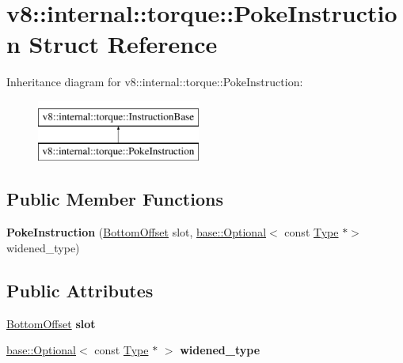 \hypertarget{structv8_1_1internal_1_1torque_1_1PokeInstruction}{}\section{v8\+:\+:internal\+:\+:torque\+:\+:Poke\+Instruction Struct Reference}
\label{structv8_1_1internal_1_1torque_1_1PokeInstruction}
Inheritance diagram for v8\+:\+:internal\+:\+:torque\+:\+:Poke\+Instruction\+:\begin{figure}[H]
\begin{center}
\leavevmode
\includegraphics[height=2.000000cm]{structv8_1_1internal_1_1torque_1_1PokeInstruction}
\end{center}
\end{figure}
\subsection*{Public Member Functions}
\begin{DoxyCompactItemize}
\item 
\mbox{\label{structv8_1_1internal_1_1torque_1_1PokeInstruction_a07a463e794c6716bfea05ec0fee29e9f}} 
{\bfseries Poke\+Instruction} (\mbox{\hyperlink{structv8_1_1internal_1_1torque_1_1BottomOffset}{Bottom\+Offset}} slot, \mbox{\hyperlink{classv8_1_1base_1_1Optional}{base\+::\+Optional}}$<$ const \mbox{\hyperlink{classv8_1_1internal_1_1torque_1_1Type}{Type}} $\ast$$>$ widened\+\_\+type)
\end{DoxyCompactItemize}
\subsection*{Public Attributes}
\begin{DoxyCompactItemize}
\item 
\mbox{\label{structv8_1_1internal_1_1torque_1_1PokeInstruction_a6ea049d9da15d05b06b69e934e3263da}} 
\mbox{\hyperlink{structv8_1_1internal_1_1torque_1_1BottomOffset}{Bottom\+Offset}} {\bfseries slot}
\item 
\mbox{\label{structv8_1_1internal_1_1torque_1_1PokeInstruction_ac2462ddb545decf60a255dbbb9de736c}} 
\mbox{\hyperlink{classv8_1_1base_1_1Optional}{base\+::\+Optional}}$<$ const \mbox{\hyperlink{classv8_1_1internal_1_1torque_1_1Type}{Type}} $\ast$ $>$ {\bfseries widened\+\_\+type}
\end{DoxyCompactItemize}


